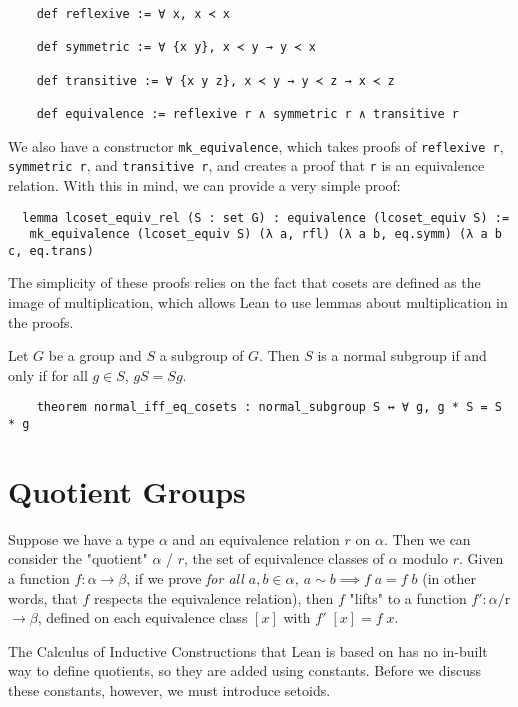 \documentclass[runningheads,a4paper]{llncs}
\renewcommand{\a}{\alpha}
\renewcommand{\b}{\beta}
\renewcommand{\-}{\setminus}
\begin{document}
\begin{lstlisting}
    def reflexive := ∀ x, x ≺ x

    def symmetric := ∀ {x y}, x ≺ y → y ≺ x

    def transitive := ∀ {x y z}, x ≺ y → y ≺ z → x ≺ z

    def equivalence := reflexive r ∧ symmetric r ∧ transitive r
\end{lstlisting}

We also have a constructor \lstinline{mk_equivalence}, which takes proofs of \lstinline{reflexive r}, \lstinline{symmetric r}, and \lstinline{transitive r}, and creates a proof that \lstinline{r} is an equivalence relation. With this in mind, we can provide a very simple proof:

\begin{lstlisting}
  lemma lcoset_equiv_rel (S : set G) : equivalence (lcoset_equiv S) := 
   mk_equivalence (lcoset_equiv S) (λ a, rfl) (λ a b, eq.symm) (λ a b c, eq.trans)
\end{lstlisting}

The simplicity of these proofs relies on the fact that cosets are defined as the image of multiplication, which allows Lean to use lemmas about multiplication in the proofs.

\begin{lemma}
Let $G$ be a group and $S$ a subgroup of $G$. Then $S$ is a normal subgroup if and only if for all $g \in S$, $gS = Sg$.
\end{lemma}

\begin{lstlisting}
    theorem normal_iff_eq_cosets : normal_subgroup S ↔ ∀ g, g * S = S * g
\end{lstlisting}

\section{Quotient Groups}

Suppose we have a type $\a$ and an equivalence relation $r$ on $\a$. Then we can consider the "quotient" $\a$ / $r$, the set of equivalence classes of $\a$ modulo $r$. Given a function $f : \a \to \b$, if we prove \textit{for all $a, b \in \a$, $a \sim b \implies f \; a = f\; b$} (in other words, that $f$ respects the equivalence relation), then $f$ "lifts" to a function $f' : \a / $r$ \to \b$, defined on each equivalence class $[x]$ with $f'\; [x] = f\; x$.

The Calculus of Inductive Constructions that Lean is based on has no in-built way to define quotients, so they are added using constants. Before we discuss these constants, however, we must introduce setoids.
\end{document}
